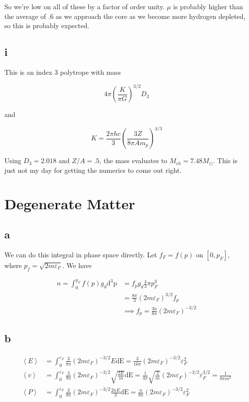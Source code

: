 \documentclass[12pt]{article}
\newcommand{\pfrac}[2]{\left(\frac{#1}{#2} \right)}
\newcommand{\ex}[1]{\left\langle#1\right\rangle}
\begin{document}
So we're low on all of these by a factor of order unity. \(\mu\) is probably higher than the average of .6 as we approach the core as we become more hydrogen depleted, so this is probably expected.

\subsection*{i}

This is an index 3 polytrope with mass

\[ 4\pi \pfrac{K}{\pi G}^{3/2} D_3
\]

and

\[ K = \frac{2\pi hc}{3} \pfrac{3Z}{8\pi A m_p}^{4/3}
\]

Using \(D_3 = 2.018\) and \(Z/A=.5\), the mass evaluates to \(M_{ch} = 7.48 M_{\odot}\). This is just not my day for getting the numerics to come out right.

\section{Degenerate Matter}

\subsection*{a}

We can do this integral in phase space directly. Let \(f_F = f(p)\) on \([0,p_F]\), where \(p_f = \sqrt{2m\varepsilon_F}\). We have

\begin{align*}
n = \int_0^{p_F} f(p) g_d \mathrm{d^3 p} &= f_p g_d \frac{4}{3}\pi p_F^3\\
&= \frac{8\pi}{3}(2m\varepsilon_F)^{3/2}f_p\\
&\implies f_p = \frac{3n}{8\pi}(2m\varepsilon_F)^{-3/2}
\end{align*}

\subsection*{b}

\begin{align*}
\ex{E} &= \int_0^{\varepsilon_F} \frac{3}{8\pi}(2m\varepsilon_F)^{-3/2} E \mathrm{dE} = \frac{3}{16\pi}(2m\varepsilon_F)^{-3/2}\varepsilon_F^2\\[10pt]
\ex{v} &= \int_0^{\varepsilon_F} \frac{3}{8\pi}(2m\varepsilon_F)^{-3/2}\sqrt{\frac{2E}{m}} \mathrm{dE} = \frac{1}{4\pi}\sqrt{\frac{2}{m}}(2m\varepsilon_F)^{-3/2} \varepsilon_F^{3/2} = \frac{1}{8\pi m^2}\\[10pt]
\ex{P} &= \int_0^{\varepsilon_F} \frac{3}{8\pi}(2m\varepsilon_F)^{-3/2} \frac{2nE}{3} \mathrm{dE} = \frac{n}{8\pi}(2m\varepsilon_F)^{-3/2}\varepsilon_F^2
\end{align*}
\end{document}
